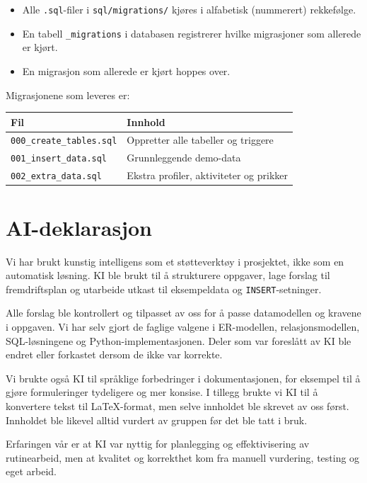 \documentclass[11pt,a4paper]{article}
\begin{document}
\begin{itemize}[noitemsep]
    \item Alle \texttt{.sql}-filer i \texttt{sql/migrations/} kjøres i
          alfabetisk (nummerert) rekkefølge.
    \item En tabell \texttt{\_migrations} i databasen registrerer
          hvilke migrasjoner som allerede er kjørt.
    \item En migrasjon som allerede er kjørt hoppes over.
\end{itemize}

Migrasjonene som leveres er:

\medskip
\begin{tabular}{ll}
\toprule
\textbf{Fil} & \textbf{Innhold} \\
\midrule
\texttt{000\_create\_tables.sql} & Oppretter alle tabeller og triggere \\
\texttt{001\_insert\_data.sql}   & Grunnleggende demo-data \\
\texttt{002\_extra\_data.sql}    & Ekstra profiler, aktiviteter og prikker \\
\bottomrule
\end{tabular}

\section{AI-deklarasjon}

Vi har brukt kunstig intelligens som et støtteverktøy i prosjektet, ikke som
en automatisk løsning. KI ble brukt til å strukturere oppgaver, lage forslag
til fremdriftsplan og utarbeide utkast til eksempeldata og
\texttt{INSERT}-setninger.

Alle forslag ble kontrollert og tilpasset av oss for å passe datamodellen og
kravene i oppgaven. Vi har selv gjort de faglige valgene i ER-modellen,
relasjonsmodellen, SQL-løsningene og Python-implementasjonen. Deler som var
foreslått av KI ble endret eller forkastet dersom de ikke var korrekte.

Vi brukte også KI til språklige forbedringer i dokumentasjonen, for eksempel
til å gjøre formuleringer tydeligere og mer konsise. I tillegg brukte vi KI
til å konvertere tekst til \LaTeX-format, men selve innholdet ble skrevet av
oss først. Innholdet ble likevel alltid vurdert av gruppen før det ble tatt i
bruk.

Erfaringen vår er at KI var nyttig for planlegging og effektivisering av
rutinearbeid, men at kvalitet og korrekthet kom fra manuell vurdering, testing
og eget arbeid.
\end{document}
